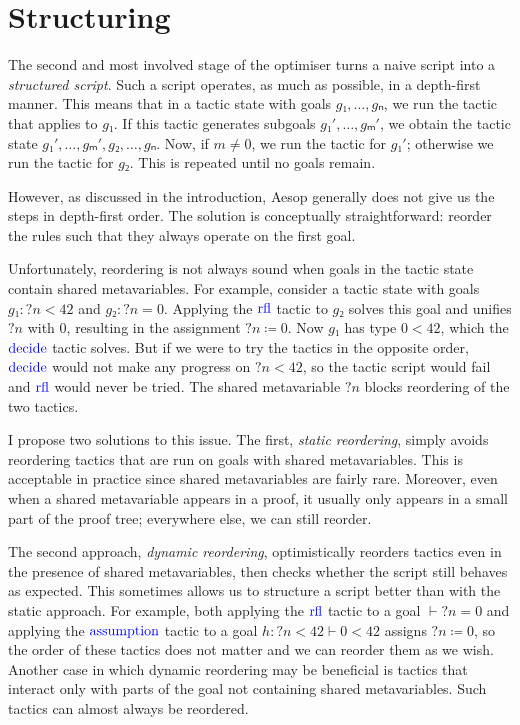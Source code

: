 \documentclass[sigplan,10pt,anonymous,review]{acmart}
\newcommand{\tac}[1]{\ensuremath{\mathrm{\mathcolor{blue}{#1}}}}
\newcommand{\mvar}[1]{{?#1}}
\begin{document}
\section{Structuring}%
\label{sec:structuring}

The second and most involved stage of the optimiser turns a naive script into a \emph{structured script}.
Such a script operates, as much as possible, in a depth-first manner.
This means that in a tactic state with goals $g₁, \dots, gₙ$, we run the tactic that applies to $g₁$.
If this tactic generates subgoals $g₁', \dots, gₘ'$, we obtain the tactic state $g₁', \dots, gₘ', g₂, \dots, gₙ$.
Now, if $m ≠ 0$, we run the tactic for $g₁'$; otherwise we run the tactic for $g₂$.
This is repeated until no goals remain.

However, as discussed in the introduction, Aesop generally does not give us the steps in depth-first order.
The solution is conceptually straightforward: reorder the rules such that they always operate on the first goal.

Unfortunately, reordering is not always sound when goals in the tactic state contain shared metavariables.
For example, consider a tactic state with goals $g₁ : \mvar{n} < 42$ and $g₂ : \mvar{n} = 0$.
Applying the \tac{rfl} tactic to $g₂$ solves this goal and unifies $\mvar{n}$ with $0$, resulting in the assignment $\mvar{n} ≔ 0$.
Now $g₁$ has type $0 < 42$, which the \tac{decide} tactic solves.
But if we were to try the tactics in the opposite order, \tac{decide} would not make any progress on $\mvar{n} < 42$, so the tactic script would fail and \tac{rfl} would never be tried.
The shared metavariable $\mvar{n}$ blocks reordering of the two tactics.

I propose two solutions to this issue.
The first, \emph{static reordering}, simply avoids reordering tactics that are run on goals with shared metavariables.
This is acceptable in practice since shared metavariables are fairly rare.
Moreover, even when a shared metavariable appears in a proof, it usually only appears in a small part of the proof tree; everywhere else, we can still reorder.

The second approach, \emph{dynamic reordering}, optimistically reorders tactics even in the presence of shared metavariables, then checks whether the script still behaves as expected.
This sometimes allows us to structure a script better than with the static approach.
For example, both applying the \tac{rfl} tactic to a goal $⊢ \mvar{n} = 0$ and applying the \tac{assumption} tactic to a goal $h : \mvar{n} < 42 ⊢ 0 < 42$ assigns $\mvar{n} ≔ 0$, so the order of these tactics does not matter and we can reorder them as we wish.
Another case in which dynamic reordering may be beneficial is tactics that interact only with parts of the goal not containing shared metavariables.
Such tactics can almost always be reordered.
\end{document}
